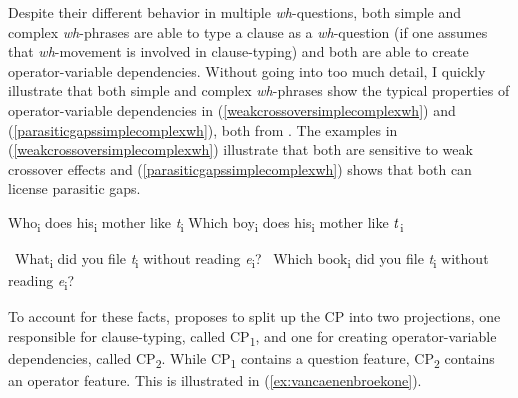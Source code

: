 Despite their different behavior in multiple \textit{wh}-questions, both simple and complex \textit{wh}-phrases are able to type a clause as a \textit{wh}-question (if one assumes that \textit{wh}-movement is involved in clause-typing) and both are able to create op\-er\-a\-tor-variable dependencies. Without going into too much detail, I quickly illustrate that both simple and complex \textit{wh}-phrases show the typical properties of operator-variable dependencies in (\ref{weakcrossoversimplecomplexwh}) and (\ref{parasiticgapssimplecomplexwh}), both from \citet[240]{van2010complex}. The examples in (\ref{weakcrossoversimplecomplexwh}) illustrate that both are sensitive to weak cross\-over effects and (\ref{parasiticgapssimplecomplexwh}) shows that both can license parasitic gaps.

\begin{exe}
\ex\label{weakcrossoversimplecomplexwh}\begin{xlist}
\ex *Who\textsubscript{i} does his\textsubscript{i} mother like \textit{t}\textsubscript{i} \label{weakcrossoversimplecomplexwha}
\ex *Which boy\textsubscript{i} does his\textsubscript{i} mother like $\textrm{\textit{t}}$\textsubscript{i} \label{weakcrossoversimplecomplexwhb}
\end{xlist}
\end{exe}

\begin{exe}
\ex\label{parasiticgapssimplecomplexwh}\begin{xlist}
\ex \textcolor{white}{*}What\textsubscript{i} did you file \textit{t}\textsubscript{i} without reading \textit{e}\textsubscript{i}? \label{parasiticgapssimplecomplexwha}
\ex \textcolor{white}{*}Which book\textsubscript{i} did you file \textit{t}\textsubscript{i} without reading \textit{e}\textsubscript{i}? \label{parasiticgapssimplecomplexwhb}
\end{xlist}
\end{exe}

\noindent To account for these facts, \citet{van2010complex, van2012you} proposes to split up the CP into two projections, one responsible for clause-typing, called CP\textsubscript{1}, and one for creating operator-variable dependencies, called CP\textsubscript{2}. While CP\textsubscript{1} contains a question feature, CP\textsubscript{2} contains an operator feature. This is illustrated in (\ref{ex:vancaenenbroekone}).


